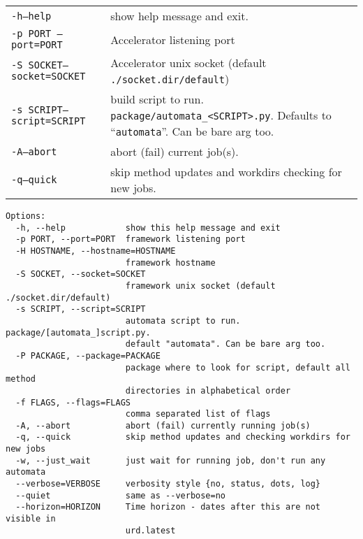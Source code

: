 \begin{tabular}{p{3cm}p{8cm}}
  \texttt{-h}\hspace{1cm}\texttt{--help} & show help message and
  exit.\\[1ex]

  \texttt{-p PORT }\hspace{1cm}\texttt{--port=PORT} & Accelerator
  listening port\\[4ex]

  \texttt{-S SOCKET}\hspace{1cm}\texttt{--socket=SOCKET} & Accelerator
  unix socket (default \texttt{./socket.dir/default})\\[4ex]

  \texttt{-s SCRIPT}\hspace{1cm}\texttt{--script=SCRIPT} & build
  script to run. \texttt{package/automata\_<SCRIPT>.py}.  Defaults to
  ``\texttt{automata}''.  Can be bare arg too.\\[4ex]

  \texttt{-A}\hspace{1cm}\texttt{--abort} & abort (fail) current job(s).\\[1ex]

  \texttt{-q}\hspace{1cm}\texttt{--quick} & skip method updates and
  workdirs checking for new jobs.\\[1ex]
  
\end{tabular}

\begin{verbatim}
Options:
  -h, --help            show this help message and exit
  -p PORT, --port=PORT  framework listening port
  -H HOSTNAME, --hostname=HOSTNAME
                        framework hostname
  -S SOCKET, --socket=SOCKET
                        framework unix socket (default ./socket.dir/default)
  -s SCRIPT, --script=SCRIPT
                        automata script to run. package/[automata_]script.py.
                        default "automata". Can be bare arg too.
  -P PACKAGE, --package=PACKAGE
                        package where to look for script, default all method
                        directories in alphabetical order
  -f FLAGS, --flags=FLAGS
                        comma separated list of flags
  -A, --abort           abort (fail) currently running job(s)
  -q, --quick           skip method updates and checking workdirs for new jobs
  -w, --just_wait       just wait for running job, don't run any automata
  --verbose=VERBOSE     verbosity style {no, status, dots, log}
  --quiet               same as --verbose=no
  --horizon=HORIZON     Time horizon - dates after this are not visible in
                        urd.latest
\end{verbatim}




